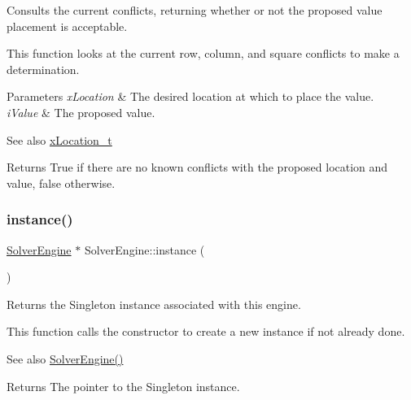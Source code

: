 Consults the current conflicts, returning whether or not the proposed value placement is acceptable. 

This function looks at the current row, column, and square conflicts to make a determination. 
\begin{DoxyParams}{Parameters}
{\em x\+Location} & The desired location at which to place the value. \\
\hline
{\em i\+Value} & The proposed value. \\
\hline
\end{DoxyParams}
\begin{DoxySeeAlso}{See also}
\mbox{\hyperlink{struct_solver_engine_1_1x_location__t}{x\+Location\+\_\+t}} 
\end{DoxySeeAlso}
\begin{DoxyReturn}{Returns}
True if there are no known conflicts with the proposed location and value, false otherwise. 
\end{DoxyReturn}
\mbox{\label{class_solver_engine_abc1e088d35a6702a58c57e3344348eab}} 
\subsubsection{\texorpdfstring{instance()}{instance()}}
{\footnotesize\ttfamily \mbox{\hyperlink{class_solver_engine}{Solver\+Engine}} $\ast$ Solver\+Engine\+::instance (\begin{DoxyParamCaption}{ }\end{DoxyParamCaption})\hspace{0.3cm}{\ttfamily [static]}}



Returns the Singleton instance associated with this engine. 

This function calls the constructor to create a new instance if not already done. \begin{DoxySeeAlso}{See also}
\mbox{\hyperlink{class_solver_engine_a76b66694da6f16000f3d9e268d87a74f}{Solver\+Engine()}} 
\end{DoxySeeAlso}
\begin{DoxyReturn}{Returns}
The pointer to the Singleton instance. 
\end{DoxyReturn}
\mbox{\label{class_solver_engine_a27aa053eb5e2a7abb602b7763ec6dea8}} 
